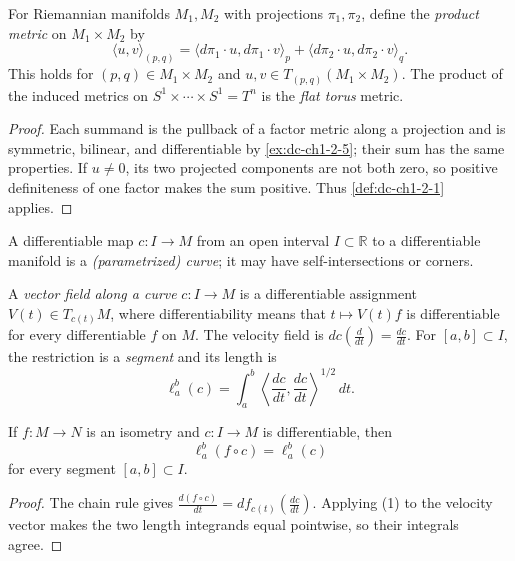 \begin{example}
  \label{ex:dc-ch1-2-7}
  \leanok
  For Riemannian manifolds $M_1,M_2$ with projections $\pi_1,\pi_2$, define
  the \emph{product metric} on $M_1\times M_2$ by
  $$
  \langle u,v\rangle_{(p,q)}=
  \langle d\pi_1\cdot u,d\pi_1\cdot v\rangle_p+
  \langle d\pi_2\cdot u,d\pi_2\cdot v\rangle_q.
  $$
  This holds for $(p,q)\in M_1\times M_2$ and
  $u,v\in T_{(p,q)}(M_1\times M_2)$.
  The product of the induced metrics on $S^1\times\cdots\times S^1=T^n$ is the
  \emph{flat torus} metric.
\end{example}
\begin{proof}
  \leanok
  \sketch
  Each summand is the pullback of a factor metric along a projection and is
  symmetric, bilinear, and differentiable by \cref{ex:dc-ch1-2-5}; their sum has
  the same properties. If $u\ne0$, its two projected components are not both zero,
  so positive definiteness of one factor makes the sum positive. Thus
  \cref{def:dc-ch1-2-1} applies.
\end{proof}

\begin{definition}
  \label{def:dc-ch1-2-8}
  \leanok
  A differentiable map $c:I\to M$ from an open interval $I\subset\mathbb{R}$ to
  a differentiable manifold is a \emph{(parametrized) curve}; it may have
  self-intersections or corners.
\end{definition}

\begin{definition}
  \label{def:dc-ch1-2-9}
  \leanok
  A \emph{vector field along a curve} $c:I\to M$ is a differentiable assignment
  $V(t)\in T_{c(t)}M$, where differentiability means that $t\mapsto V(t)f$ is
  differentiable for every differentiable $f$ on $M$. The velocity field is
  $dc(\frac{d}{dt})=\frac{dc}{dt}$. For $[a,b]\subset I$, the restriction is a
  \emph{segment} and its length is
  $$
  \ell_a^b(c)=\int_a^b\left\langle\frac{dc}{dt},\frac{dc}{dt}\right\rangle^{1/2}\,dt.
  $$
\end{definition}

\begin{lemma}
  \label{lem:dc-ch1-2-9-isom}
  \leanok
  If $f:M\to N$ is an isometry and $c:I\to M$ is differentiable, then
  $$
  \ell_a^b(f\circ c)=\ell_a^b(c)
  $$
  for every segment $[a,b]\subset I$.
\end{lemma}
\begin{proof}
  \leanok
  \sketch
  The chain rule gives $\frac{d(f\circ c)}{dt}=df_{c(t)}(\frac{dc}{dt})$. Applying
  (1) to the velocity vector makes the two length integrands equal pointwise, so
  their integrals agree.
\end{proof}

